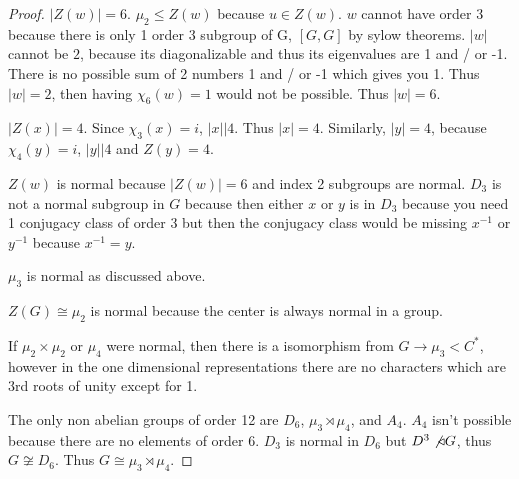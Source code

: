 \documentclass{article}
\begin{document}
\begin{proof}
    $|Z(w)| = 6$. $\mu_2 \leq Z(w)$ because $u \in Z(w)$. $w$ cannot have order 3 because there is only 1 order 3 subgroup of G, $[G, G]$ by sylow theorems. 
    $|w|$ cannot be $2$, because its diagonalizable and thus its eigenvalues are 1 and / or -1. There is no possible sum of 2 numbers 1 and / or -1 which gives you 1. Thus $|w| = 2$, then having $\chi_6(w) = 1$ would not be possible. Thus $|w| = 6$.  

    $|Z(x)| = 4$. Since $\chi_3(x) = i$, $|x| | 4$. Thus $|x| = 4$. Similarly, $|y| =  4$, because $\chi_4(y) = i$, $|y| | 4$ and $Z(y) = 4$. 
    
    $Z(w)$ is normal because $|Z(w)| = 6$ and index 2 subgroups are normal. $D_3$ is not a normal subgroup in $G$ because then either $x$ or $y$ is in $D_3$ because you need 1 conjugacy class of order 3 but then the conjugacy class would be missing $x^{-1}$ or $y^{-1}$  because $x^{-1} = y$. 
    
    
    $\mu_3$ is normal as discussed above. 
    
    $Z(G) \cong \mu_2$ is normal because the center is always normal in a group. 
    
    
    If $\mu_2 \times \mu_2$ or $\mu_4$ were normal, then there is a isomorphism from $G \to \mu_3 < C^*$, however in the one dimensional representations there are no characters which are 3rd roots of unity except for 1. 
    
    The only non abelian groups of order 12 are $D_6$, $\mu_3 \rtimes \mu_4$, and $A_4$. $A_4$ isn't possible because there are no elements of order 6. $D_3$ is normal in $D_6$ but $D^3 \not \triangleleft G$, thus $G \not \cong D_6$. Thus $G  \cong \mu_3 \rtimes \mu_4$.      
\end{proof}

\bigskip
\end{document}
